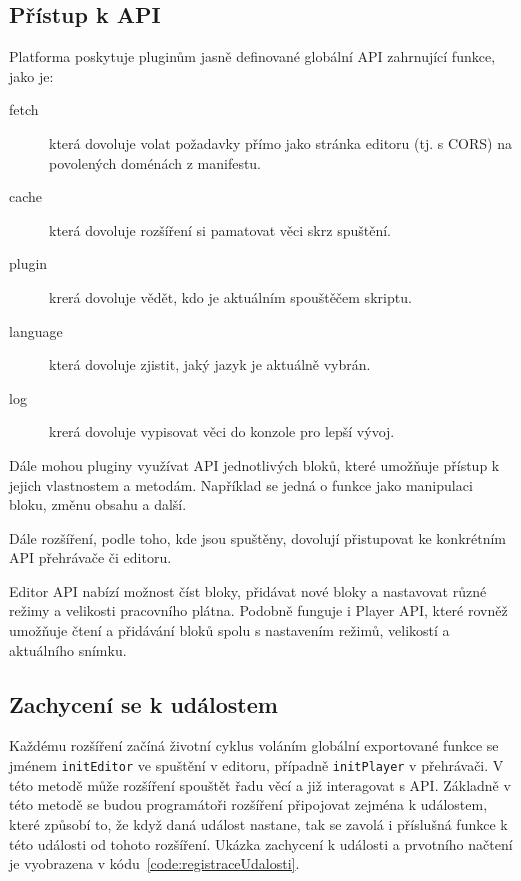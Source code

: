 \subsection{Přístup k API}

Platforma poskytuje pluginům jasně definované globální API zahrnující funkce, jako je:

\begin{description}
    \item[fetch] která dovoluje volat požadavky přímo jako stránka editoru (tj. s CORS) na povolených doménách z manifestu.
    \item[cache] která dovoluje rozšíření si pamatovat věci skrz spuštění.
    \item[plugin] krerá dovoluje vědět, kdo je aktuálním spouštěčem skriptu.
    \item[language] která dovoluje zjistit, jaký jazyk je aktuálně vybrán.
    \item[log] krerá dovoluje vypisovat věci do konzole pro lepší vývoj.
\end{description}

Dále mohou pluginy využívat API jednotlivých bloků, které umožňuje přístup k jejich vlastnostem a metodám.
Například se jedná o funkce jako manipulaci bloku, změnu obsahu a další.

Dále rozšíření, podle toho, kde jsou spuštěny, dovolují přistupovat ke konkrétním API přehrávače či editoru.

Editor API nabízí možnost číst bloky, přidávat nové bloky a nastavovat různé režimy a velikosti pracovního plátna. 
Podobně funguje i Player API, které rovněž umožňuje čtení a přidávání bloků spolu s nastavením režimů, velikostí a aktuálního snímku.

\subsection{Zachycení se k událostem}

Každému rozšíření začíná životní cyklus voláním globální exportované funkce se jménem \texttt{initEditor} ve spuštění v editoru, případně \texttt{initPlayer} v přehrávači.
V této metodě může rozšíření spouštět řadu věcí a již interagovat s API.
Základně v této metodě se budou programátoři rozšíření připojovat zejména k událostem, které způsobí to, že když daná událost nastane, tak se zavolá i příslušná funkce k této události od tohoto rozšíření. 
Ukázka zachycení k události a prvotního načtení je vyobrazena v kódu~\ref{code:registraceUdalosti}.

